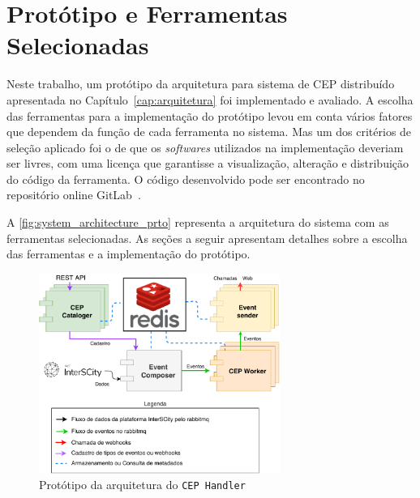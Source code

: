\chapter{Protótipo e Ferramentas Selecionadas}
\label{cap:prototype}






Neste trabalho, um protótipo da arquitetura para sistema de CEP distribuído apresentada no Capítulo~\ref{cap:arquitetura} foi implementado e avaliado. 
A escolha das ferramentas para a implementação do protótipo levou em conta vários fatores que dependem da função de cada ferramenta no sistema. Mas um dos critérios de seleção aplicado foi o de que os \textit{softwares} utilizados na implementação deveriam ser livres, com uma licença que garantisse a visualização,  alteração e distribuição do código da ferramenta. O código desenvolvido pode ser encontrado no repositório online GitLab~\citep{CEPHandler}. 

A \autoref{fig:system_architecture_prto} representa a arquitetura do sistema com as ferramentas selecionadas.
As seções a seguir apresentam detalhes sobre a escolha das ferramentas e a implementação do protótipo.


\begin{figure}[hb!]
      \centering
      \includegraphics[width=0.7\textwidth]{figuras/graphics/prot_dia.pdf}
      \caption{Protótipo da arquitetura do \texttt{CEP Handler}}
      \label{fig:system_architecture_prto}
\end{figure}

